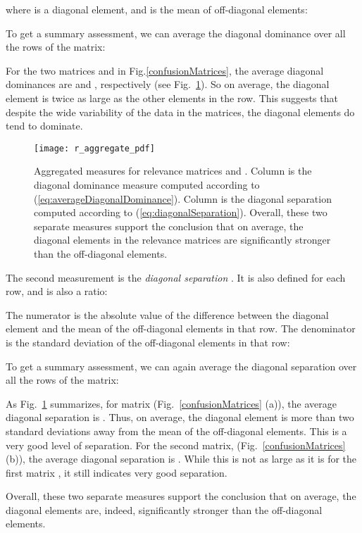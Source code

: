 \documentclass[prodmode,acmtochi]{acmsmall}
\begin{document}
where  is a diagonal element, and  is the mean of off-diagonal elements:



To get a summary assessment, we can average the diagonal dominance over all the rows of the matrix:

For the two matrices  and  in Fig.\ref{confusionMatrices}, the average diagonal dominances are  and , respectively (see Fig.~\ref{confusionMatrices_aggregate}). So on average, the diagonal element is twice as large as the other elements in the row. This suggests that despite the wide variability of the data in the matrices, the diagonal elements do tend to dominate.

\begin{figure}[h!tb]
  \centering
    \texttt{[image: r\_aggregate\_pdf]}
  \caption{Aggregated measures for relevance matrices  and . Column  is the diagonal dominance measure computed according to (\ref{eq:averageDiagonalDominance}). Column  is the diagonal separation computed according to (\ref{eq:diagonalSeparation}). Overall, these two separate measures support the conclusion that on average, the diagonal elements in the relevance matrices are significantly stronger than the off-diagonal elements.}
  \label{confusionMatrices_aggregate}
\end{figure}

The second measurement is the \emph{diagonal separation} . It is also defined for each row, and is also a ratio:

The numerator is the absolute value of the difference between the diagonal element and the mean of the off-diagonal elements in that row. The denominator is the standard deviation of the off-diagonal elements in that row:


To get a summary assessment, we can again average the diagonal separation over all the rows of the matrix:


As Fig.~\ref{confusionMatrices_aggregate} summarizes, for matrix  (Fig.~\ref{confusionMatrices} (a)), the average diagonal separation is . Thus, on average, the diagonal element is more than two standard deviations away from the mean of the off-diagonal elements. This is a very good level of separation. For the second matrix,  (Fig.~\ref{confusionMatrices} (b)), the average diagonal separation is . While this is not as large as it is for the first matrix , it still indicates very good separation.

Overall, these two separate measures support the conclusion that on average, the diagonal elements are, indeed, significantly stronger than the off-diagonal elements.
\end{document}
